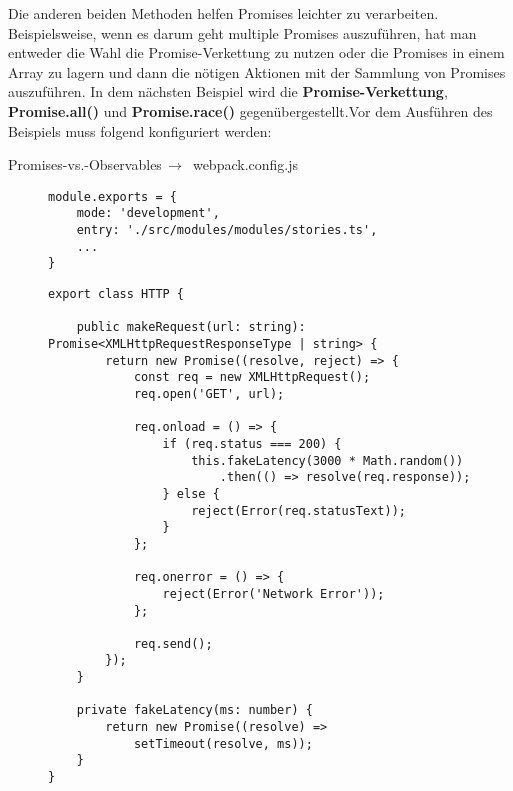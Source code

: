 \noindent
Die anderen beiden Methoden helfen Promises leichter zu verarbeiten. Beispielsweise, wenn es darum geht multiple Promises auszuführen, hat man entweder die Wahl die Promise-Verkettung zu nutzen oder die Promises in einem Array zu lagern und dann die nötigen Aktionen mit der Sammlung von Promises auszuführen. In dem nächsten Beispiel wird die \textbf{Promise-Verkettung}, \textbf{Promise.all()} und \textbf{Promise.race()} gegenübergestellt.Vor dem Ausführen des Beispiels muss folgend konfiguriert werden:

 \begin{center}
     Promises-vs.-Observables$\,\to\,$ webpack.config.js
 \end{center}

\begin{figure}[H]
\begin{lstlisting}
module.exports = {
    mode: 'development',
    entry: './src/modules/modules/stories.ts',
    ...
}
\end{lstlisting}
\end{figure}


\begin{figure}[H]
\begin{lstlisting}
export class HTTP {

    public makeRequest(url: string): Promise<XMLHttpRequestResponseType | string> {
        return new Promise((resolve, reject) => {
            const req = new XMLHttpRequest();
            req.open('GET', url);

            req.onload = () => {
                if (req.status === 200) {
                    this.fakeLatency(3000 * Math.random())
                        .then(() => resolve(req.response));
                } else {
                    reject(Error(req.statusText));
                }
            };

            req.onerror = () => {
                reject(Error('Network Error'));
            };

            req.send();
        });
    }

    private fakeLatency(ms: number) {
        return new Promise((resolve) =>
            setTimeout(resolve, ms));
    }
}
\end{lstlisting}
\end{figure}


